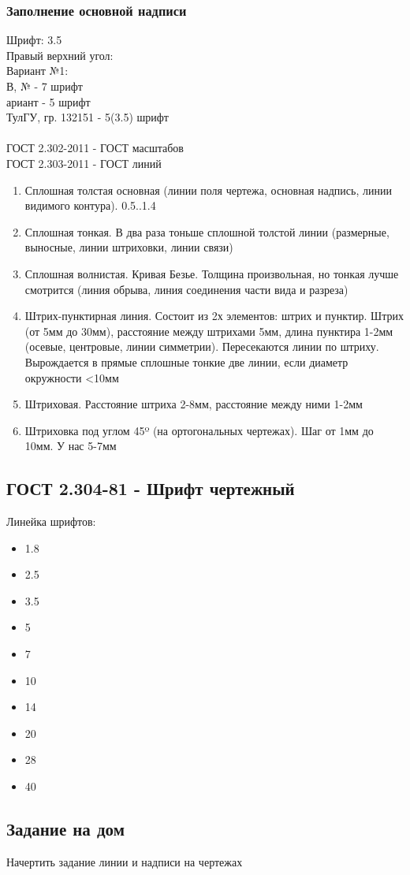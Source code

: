 \documentclass[a4paper, 11pt, oneside]{article}
\begin{document}
\subsubsection{Заполнение основной надписи}
Шрифт: 3.5\\
Правый верхний угол:\\
Вариант №1:\\
В, № - 7 шрифт\\
ариант - 5 шрифт\\
ТулГУ, гр. 132151 - 5(3.5) шрифт\\\\
ГОСТ 2.302-2011 - ГОСТ масштабов\\
ГОСТ 2.303-2011 - ГОСТ линий
\begin{enumerate}
	\item Сплошная толстая основная (линии поля чертежа, основная надпись, линии видимого контура). 0.5..1.4
	\item Сплошная тонкая. В два раза тоньше сплошной толстой линии (размерные, выносные, 
		линии штриховки, линии связи)
	\item Сплошная волнистая. Кривая Безье. Толщина произвольная, но тонкая лучше смотрится
		(линия обрыва, линия соединения части вида и разреза)
	\item Штрих-пунктирная линия. Состоит из 2х элементов: штрих и пунктир. Штрих (от 5мм до 30мм),
		расстояние между штрихами 5мм, длина пунктира 1-2мм (осевые, центровые, линии симметрии). 
		Пересекаются линии по штриху. Вырождается в прямые сплошные
		тонкие две линии, если диаметр окружности <10мм
	\item Штриховая. Расстояние штриха 2-8мм, расстояние между ними 1-2мм
	\item Штриховка под углом 45º (на ортогональных чертежах). Шаг от 1мм до 10мм. У нас 5-7мм
\end{enumerate}
\subsection{ГОСТ 2.304-81 - Шрифт чертежный}
Линейка шрифтов:
\begin{itemize}
	\item 1.8
	\item 2.5
	\item 3.5
	\item 5
	\item 7
	\item 10
	\item 14
	\item 20
	\item 28
	\item 40
\end{itemize}


















\subsection{Задание на дом}
Начертить задание линии и надписи на чертежах
\end{document}
